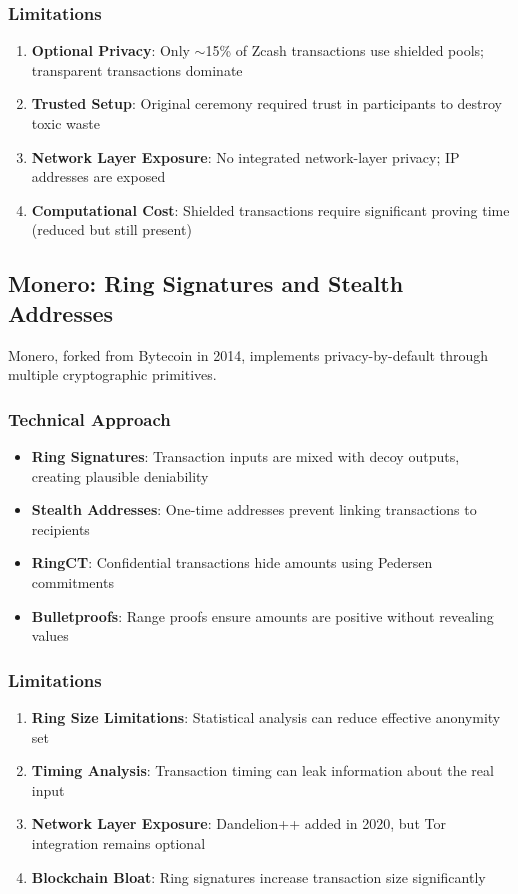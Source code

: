 \documentclass[11pt,a4paper]{article}
\begin{document}
\subsubsection{Limitations}
\begin{enumerate}[leftmargin=*]
    \item \textbf{Optional Privacy}: Only $\sim$15\% of Zcash transactions use shielded pools; transparent transactions dominate
    \item \textbf{Trusted Setup}: Original ceremony required trust in participants to destroy toxic waste
    \item \textbf{Network Layer Exposure}: No integrated network-layer privacy; IP addresses are exposed
    \item \textbf{Computational Cost}: Shielded transactions require significant proving time (reduced but still present)
\end{enumerate}

\subsection{Monero: Ring Signatures and Stealth Addresses}

Monero, forked from Bytecoin in 2014, implements privacy-by-default through multiple cryptographic primitives.

\subsubsection{Technical Approach}
\begin{itemize}[leftmargin=*]
    \item \textbf{Ring Signatures}: Transaction inputs are mixed with decoy outputs, creating plausible deniability
    \item \textbf{Stealth Addresses}: One-time addresses prevent linking transactions to recipients
    \item \textbf{RingCT}: Confidential transactions hide amounts using Pedersen commitments
    \item \textbf{Bulletproofs}: Range proofs ensure amounts are positive without revealing values
\end{itemize}

\subsubsection{Limitations}
\begin{enumerate}[leftmargin=*]
    \item \textbf{Ring Size Limitations}: Statistical analysis can reduce effective anonymity set
    \item \textbf{Timing Analysis}: Transaction timing can leak information about the real input
    \item \textbf{Network Layer Exposure}: Dandelion++ added in 2020, but Tor integration remains optional
    \item \textbf{Blockchain Bloat}: Ring signatures increase transaction size significantly
\end{enumerate}
\end{document}

